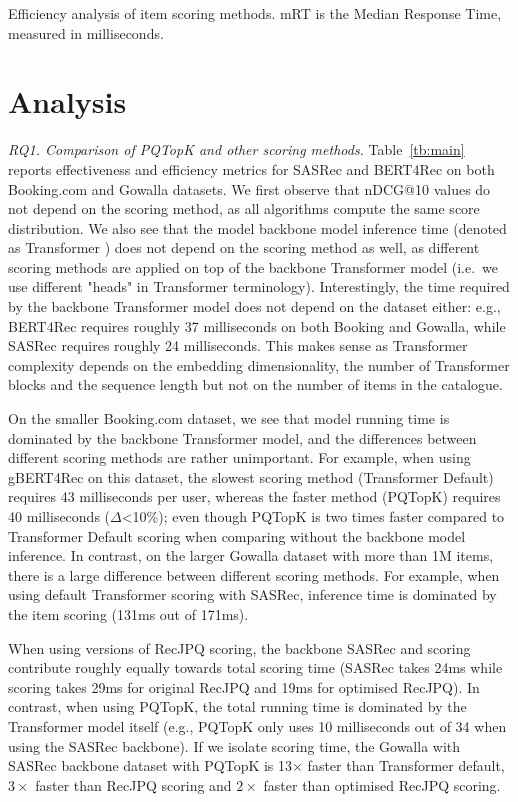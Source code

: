 \documentclass[sigconf,natbib=true, review=true]{acmart} %
\newcommand{\pageenlarge}[1]{\marginnote{#1}\enlargethispage{#1\baselineskip}}
\newcommand{\rsasha}[1]{\textcolor[HTML]{FF0000}{#1}}
\begin{document}
\begin{table}
\caption{Efficiency analysis of item scoring methods. mRT is the Median Response Time, measured in milliseconds.} \label{tb:main}
\resizebox{\linewidth}{!}{
    
}
\end{table}


\section{Analysis}
\pageenlarge{3}
\textit{RQ1. Comparison of PQTopK and other scoring methods.} Table~\ref{tb:main} reports effectiveness and efficiency metrics for SASRec and BERT4Rec on both Booking.com and Gowalla datasets. We first observe that nDCG@10 values do not depend on the scoring method, as all algorithms compute the same score distribution. We also see that \rsasha{the model backbone model inference time (denoted as Transformer )} does not depend on the scoring method as well, as different scoring methods are applied on top of the backbone Transformer model (i.e.\ we use different "heads" in Transformer terminology). Interestingly, the time required by the backbone Transformer model does not depend on the dataset either: e.g., BERT4Rec requires roughly 37 milliseconds on both Booking and Gowalla, while SASRec requires roughly 24 milliseconds. This makes sense as Transformer complexity depends on the embedding dimensionality, the number of Transformer blocks and the sequence length but not on the number of items in the catalogue.

On the smaller Booking.com dataset, we see that model running time is dominated by the backbone Transformer model, and the differences between different scoring methods are rather unimportant. For example, when using gBERT4Rec on this dataset, the slowest scoring method (Transformer Default) requires 43 milliseconds per user, whereas the faster method (PQTopK) requires 40 milliseconds ($\Delta$<10\%); \rsasha{even though PQTopK is two times faster compared to Transformer Default scoring when comparing without the backbone model inference.}  In contrast, on the larger Gowalla dataset with more than 1M items, there is a large difference between different scoring methods. For example, when using default Transformer scoring with SASRec, inference time is dominated by the item scoring (131ms out of 171ms). 

When using versions of RecJPQ scoring,  the backbone SASRec and scoring contribute roughly equally towards total scoring time (SASRec takes 24ms while scoring takes 29ms for original RecJPQ and 19ms for optimised RecJPQ). \rsasha{In contrast}, when using PQTopK, the total running time \rsasha{is dominated by} the Transformer model itself (e.g., PQTopK only uses 10 milliseconds out of 34 when using the SASRec backbone). If we isolate scoring time, the Gowalla with SASRec backbone dataset with  PQTopK is 13$\times$ faster than Transformer default, $3\times$ faster than RecJPQ scoring and $2\times$ faster than optimised RecJPQ scoring.
\end{document}
